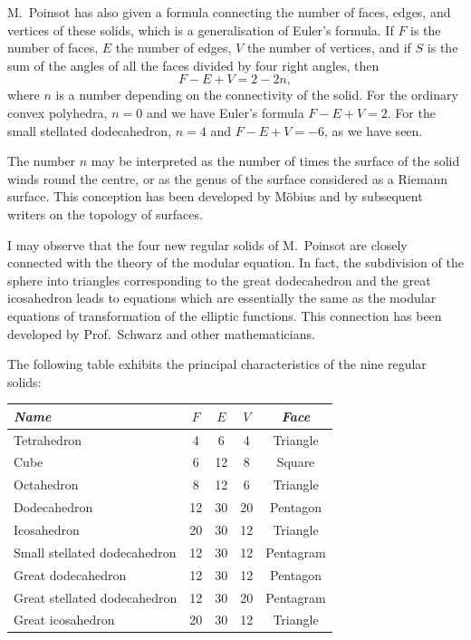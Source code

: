 \documentclass[11pt,a4paper]{article}
\begin{document}
\setcounter{page}{84}

M.~Poinsot has also given a formula connecting the number of faces, edges, and vertices of these solids, which is a generalisation of Euler's formula. If $F$ is the number of faces, $E$ the number of edges, $V$ the number of vertices, and if $S$ is the sum of the angles of all the faces divided by four right angles, then
\[
F - E + V = 2 - 2n,
\]
where $n$ is a number depending on the connectivity of the solid. For the ordinary convex polyhedra, $n=0$ and we have Euler's formula $F-E+V=2$. For the small stellated dodecahedron, $n=4$ and $F-E+V=-6$, as we have seen.

The number $n$ may be interpreted as the number of times the surface of the solid winds round the centre, or as the genus of the surface considered as a Riemann surface. This conception has been developed by Möbius and by subsequent writers on the topology of surfaces.

\setcounter{page}{85}

I may observe that the four new regular solids of M.~Poinsot are closely connected with the theory of the modular equation. In fact, the subdivision of the sphere into triangles corresponding to the great dodecahedron and the great icosahedron leads to equations which are essentially the same as the modular equations of transformation of the elliptic functions. This connection has been developed by Prof.~Schwarz and other mathematicians.

The following table exhibits the principal characteristics of the nine regular solids:

\begin{center}
\begin{tabular}{lcccc}
\toprule
\textit{Name} & $F$ & $E$ & $V$ & \textit{Face} \\
\midrule
Tetrahedron & 4 & 6 & 4 & Triangle \\
Cube & 6 & 12 & 8 & Square \\
Octahedron & 8 & 12 & 6 & Triangle \\
Dodecahedron & 12 & 30 & 20 & Pentagon \\
Icosahedron & 20 & 30 & 12 & Triangle \\
Small stellated dodecahedron & 12 & 30 & 12 & Pentagram \\
Great dodecahedron & 12 & 30 & 12 & Pentagon \\
Great stellated dodecahedron & 12 & 30 & 20 & Pentagram \\
Great icosahedron & 20 & 30 & 12 & Triangle \\
\bottomrule
\end{tabular}
\end{center}
\end{document}

